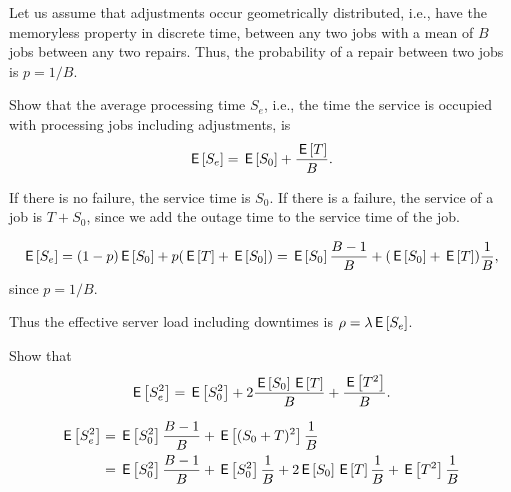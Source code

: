\begin{comment}
The number of jobs that arrive, on average, during one
  production cycle must be smaller than the total amount of jobs that
  can be served, on average, during one cycle.   The number of arrivals during the repair is $\lambda \E{T}$. The number of arrivals during serving the batch is $\lambda B \E{S}$. Thus, 
  \begin{equation*}
    \lambda ( B \E S + \E{T}) \leq B.
  \end{equation*}
  When equality holds here, the system is critically loaded. As we
  discussed before, that it not a good idea.

Finally, bring $B$ to one side.
\end{solution}
\end{exercise}
\end{comment}

Let us assume that adjustments occur geometrically distributed, i.e., have the memoryless property in discrete time, between any two jobs with a mean of $B$ jobs between any two repairs.  Thus, the probability of a repair between two jobs is $p=1/B$. 

\begin{exercise}
  Show that the average  processing time $S_e$, i.e., the time the service is occupied with processing jobs including adjustments, is 
  \begin{equation*}
    \,\mathsf{E}\left[S_e\right] = \,\mathsf{E}\left[S_0\right] + \frac{\,\mathsf{E}\left[T\right]}B.
  \end{equation*}
\begin{hint}
If there is no failure, the service time is $S_0$. If there is a failure, the service of a job is $T + S_0$, since we add the outage time to the service time of the job. 
\end{hint}
  \begin{solution}
    \begin{equation*}
      \,\mathsf{E}\left[S_e\right] = (1-p)\,\mathsf{E}\left[S_0\right] + p (\,\mathsf{E}\left[T\right] + \,\mathsf{E}\left[S_0\right]) = \,\mathsf{E}\left[S_0\right] \frac{B-1}B + (\,\mathsf{E}\left[S_0\right] + \,\mathsf{E}\left[T\right]) \frac 1B,
    \end{equation*}
since $p=1/B$. 
  \end{solution}
\end{exercise}

Thus the effective server load including downtimes is $\rho = \lambda \,\mathsf{E}\left[S_e\right]$. 

\begin{exercise}
  Show that
  \begin{equation*}
    \,\mathsf{E}\left[S_e^2\right] = \,\mathsf{E}\left[S_0^2\right] + 2\frac{\,\mathsf{E}\left[S_0\right]\,\mathsf{E}\left[T\right]} B + \frac{\,\mathsf{E}\left[T^2\right]}B.
  \end{equation*}
  \begin{solution}
  \begin{equation*}
    \begin{split}
    \,\mathsf{E}\left[S_e^2\right] 
&= \,\mathsf{E}\left[S_0^2\right]\frac{B-1}B + \,\mathsf{E}\left[(S_0+T)^2\right]\frac 1B \\
&= \,\mathsf{E}\left[S_0^2\right]\frac{B-1}B + \,\mathsf{E}\left[S_0^2\right] \frac 1 B + 2 \,\mathsf{E}\left[S_0\right] \,\mathsf{E}\left[T\right]\frac 1B + \,\mathsf{E}\left[T^2\right]\frac 1B
    \end{split}
  \end{equation*}
  \end{solution}
\end{exercise}

